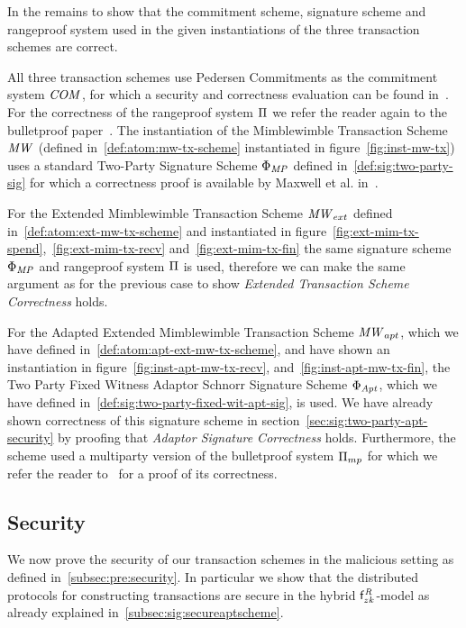 In the remains to show that the commitment scheme, signature scheme and rangeproof system used in the given instantiations of the three transaction schemes are correct.

All three transaction schemes use Pedersen Commitments as the commitment system $\mathit{COM}$, for which a security and correctness evaluation can be found in~\cite{pedersen1991non}.
For the correctness of the rangeproof system $\Pi$ we refer the reader again to the bulletproof paper~\cite{bunz2018bulletproofs}.
The instantiation of the Mimblewimble Transaction Scheme $\mathit{MW}$ (defined in~\ref{def:atom:mw-tx-scheme} instantiated in figure~\ref{fig:inst-mw-tx}) uses a standard Two-Party Signature Scheme $\Phi_{\mathit{MP}}$ defined in~\ref{def:sig:two-party-sig} for which a correctness proof is available by Maxwell et al. in~\cite{maxwell2019simple}.

For the Extended Mimblewimble Transaction Scheme $\mathit{MW}_{ext}$ defined in~\ref{def:atom:ext-mw-tx-scheme} and instantiated in figure~\ref{fig:ext-mim-tx-spend},~\ref{fig:ext-mim-tx-recv} and~\ref{fig:ext-mim-tx-fin} the same signature scheme $\Phi_{\mathit{MP}}$ and rangeproof system $\Pi$ is used, therefore we can make the same argument as for the previous case to show \emph{Extended Transaction Scheme Correctness} holds.

For the Adapted Extended Mimblewimble Transaction Scheme $\mathit{MW}_{apt}$, which we have defined in~\ref{def:atom:apt-ext-mw-tx-scheme}, and have shown an instantiation in figure~\ref{fig:inst-apt-mw-tx-recv}, and~\ref{fig:inst-apt-mw-tx-fin}, the Two Party Fixed Witness Adaptor Schnorr Signature Scheme $\Phi_{\mathit{Apt}}$, which we have defined in~\ref{def:sig:two-party-fixed-wit-apt-sig}, is used.
We have already shown correctness of this signature scheme in section~\ref{sec:sig:two-party-apt-security} by proofing that \emph{Adaptor Signature Correctness} holds.
Furthermore, the scheme used a multiparty version of the bulletproof system $\Pi_{mp}$ for which we refer the reader to~\cite{klinec2020privacy} for a proof of its correctness.

\subsection{Security}\label{subsec:atom:security}

We now prove the security of our transaction schemes in the malicious setting as defined in~\ref{subsec:pre:security}.
In particular we show that the distributed protocols for constructing transactions are secure in the hybrid $\mathsf{f}^{\mathit{R}}_{zk}$-model as already explained in~\ref{subsec:sig:secureaptscheme}.


